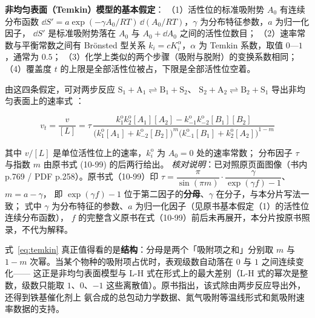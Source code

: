 \begin{principle}
\textbf{非均匀表面（Temkin）模型的基本假定}：
（1）活性位的标准吸附势 $A_0$ 有连续分布函数
$\dd S'=a\exp(-\gamma A_0/RT)\,\dd(A_0/RT)$，$\gamma$ 为分布特征参数，$a$ 为归一化因子，
$\dd S'$ 是标准吸附势落在 $A_0$ 与 $A_0+\dd A_0$ 之间的活性位数目；
（2）速率常数与平衡常数之间有 Br\"onsted 型关系 $k_i=cK_i^{\alpha}$，$\alpha$ 为
Temkin 系数，取值 $0$—$1$，通常为 $0.5$；
（3）化学上类似的两个步骤（吸附与脱附）的变换系数相同；
（4）覆盖度 $t$ 的上限是全部活性位被占，下限是全部活性位空着。
\end{principle}

由这四条假定，可对两步反应 $\mathrm{S_1+A_1\rightleftharpoons B_1+S_2}$、
$\mathrm{S_2+A_2\rightleftharpoons B_2+S_1}$ 导出非均匀表面上的速率式
：

\begin{equation}
v_t=\frac{v}{[L]}
=\tau\,
\frac{k_1^{\mathrm{o}}k_2^{\mathrm{o}}[A_1][A_2]-k_{-1}^{\mathrm{o}}k_{-2}^{\mathrm{o}}[B_1][B_2]}
{\bigl(k_1^{\mathrm{o}}[A_1]+k_{-2}^{\mathrm{o}}[B_2]\bigr)^{m}
 \bigl(k_{-1}^{\mathrm{o}}[B_1]+k_2^{\mathrm{o}}[A_2]\bigr)^{1-m}}
\label{eq:temkin}
\end{equation}

其中 $v/[L]$ 是单位活性位上的速率，$k_i^{\mathrm{o}}$ 为 $A_0=0$ 处的速率常数；
分布因子 $\tau$ 与指数 $m$ 由原书式 (10-99) 的后两行给出。
\emph{核对说明}：已对照原页面图像（书内 p.769 / PDF p.258）。原书式（10-99）印
$\tau=\dfrac{\pi}{\sin(\pi m)}\cdot\dfrac{\gamma}{\exp(\gamma f)-1}$、$m=a-\gamma$，
即 $\exp(\gamma f)-1$ 位于第二因子的\textbf{分母}、$\gamma$ 在分子，与本分片写法一致；
式中 $\gamma$ 为分布特征的参数、$a$ 为归一化因子（见原书基本假定（1）的活性位连续分布函数），
$f$ 的完整含义原书在式（10-99）前后未再展开，本分片按原书照录，不代为解释。

式~\eqref{eq:temkin} 真正值得看的是\textbf{结构}：分母是两个「吸附项之和」分别取 $m$ 与
$1-m$ 次幂。当某个物种的吸附项占优时，表观级数自动落在 $0$ 与 $1$ 之间连续变化——
这正是非均匀表面模型与 L-H 式在形式上的最大差别（L-H 式的幂次是整数，级数只能取
$1$、$0$、$-1$ 这些离散值）。原书指出，该式除由两步反应导出外，还得到铁基催化剂上
氨合成的总包动力学数据、氮气吸附等温线形式和氮吸附速率数据的支持。

